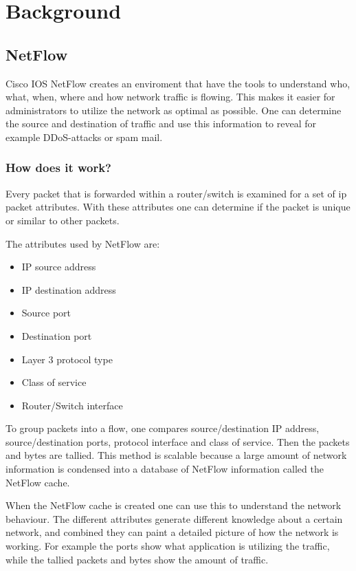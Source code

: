 \chapter{Background}
\label{chp:background} 

\section{NetFlow}
\label{netflow}
Cisco IOS NetFlow creates an enviroment that have the tools to understand who, what, when, where and how network traffic is flowing. This makes it easier for administrators to utilize the network as optimal as possible. One can determine the source and destination of traffic and use this information to reveal for example DDoS-attacks or spam mail.
\citep{flow_monitoring}
\subsection{How does it work?}
Every packet that is forwarded within a router/switch is examined for a set of \gls{ip} packet attributes. With these attributes one can determine if the packet is unique or similar to other packets. 

The attributes used by NetFlow are:
\begin{itemize}
\item IP source address
\item IP destination address
\item Source port
\item Destination port
\item Layer 3 protocol type
\item Class of service
\item Router/Switch interface
\end{itemize}

To group packets into a flow, one compares source/destination IP address, source/destination ports, protocol interface and class of service. Then the packets and bytes are tallied. This method is scalable because a large amount of network information is condensed into a database of NetFlow information called the NetFlow cache. 

When the NetFlow cache is created one can use this to understand the network behaviour. The different attributes generate different knowledge about a certain network, and combined they can paint a detailed picture of how the network is working. For example the ports show what application is utilizing the traffic, while the tallied packets and bytes show the amount of traffic. 
\citep{cisco_netflow} \citep{netflow_evolve}

